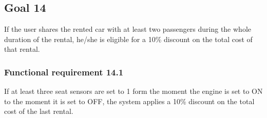 \subsection{Goal 14}
If the user shares the rented car with at least two passengers during the whole duration of the rental, he/she is eligible for a 10\% discount on the total cost of that rental.

\setcounter{secnumdepth}{3}
\subsubsection{Functional requirement 14.1}
If at least three seat sensors are set to 1 form the moment the engine is set to ON to the moment it is set to OFF, the system applies a 10\% discount on the total cost of the last rental.